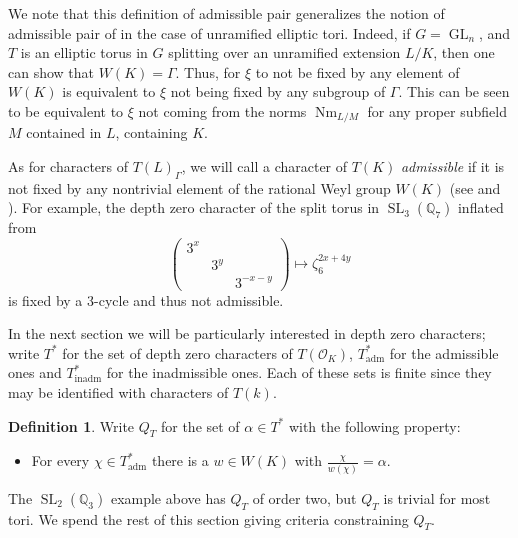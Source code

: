 \documentclass[11pt]{amsart}
\theoremstyle{plain}
\theoremstyle{definition}
\newtheorem{definition}[theorem]{Definition}
\DeclareMathOperator{\Nm}{Nm}
\DeclareMathOperator{\GL}{GL}
\DeclareMathOperator{\SL}{SL}
\newcommand{\OK}{\mathcal{O}_K}
\newcommand{\QQ}{\mathbb{Q}}
\newcommand{\Thadm}{T^*_{\operatorname{adm}}}
\newcommand{\Thinadm}{T^*_{\operatorname{inadm}}}
\newcommand{\hatT}{T^*}
\begin{document}
We note that this definition of admissible pair generalizes
the notion of admissible pair of \cite{bushnell-henniart:10a} in
the case of unramified elliptic tori.  Indeed,
if $G = \GL_n$, and $T$ is an elliptic torus in $G$ splitting over
an unramified extension $L/K$, then one can show that
$W(K) = \Gamma$.  Thus, for $\xi$ to not be fixed by any
element of $W(K)$ is equivalent to $\xi$ not being fixed by
any subgroup of $\Gamma$.  This can be seen to be equivalent to $\xi$
not coming from the norms $\Nm_{L/M}$ for any proper subfield $M$ contained
in $L$, containing $K$.

As for characters of $T(L)_\Gamma$, we will call a character of $T(K)$ \emph{admissible}
if it is not fixed by any nontrivial element
of the rational Weyl group $W(K)$ (see \cite[p. 802]{reeder-debacker:09a} and \cite[\S3]{reeder:08a}).
For example, the depth zero character of the split torus in $\SL_3(\QQ_7)$ inflated from
$$\begin{pmatrix} 3^x & & \\ & 3^y & \\ & & 3^{-x-y} \end{pmatrix} \mapsto \zeta_6^{2x + 4y}$$
is fixed by a 3-cycle and thus not admissible.

In the next section we will be particularly interested in depth zero characters; write $\hatT$ for the set of
depth zero characters of $T(\OK)$, $\Thadm$ for the admissible
ones and $\Thinadm$ for the inadmissible ones.  Each of these
sets is finite since they may be identified with characters of $T(k)$.

\begin{definition}
Write $Q_T$ for the set of $\alpha \in \hatT$ with the following property:
\begin{itemize}
\item For every $\chi \in \Thadm$ there is a $w \in W(K)$ with $\frac{\chi}{w(\chi)} = \alpha$.
\end{itemize}
\end{definition}

The $\SL_2(\QQ_3)$ example above has $Q_T$ of order two, but $Q_T$ is trivial for most tori.
We spend the rest of this section giving criteria constraining $Q_T$.
\end{document}
